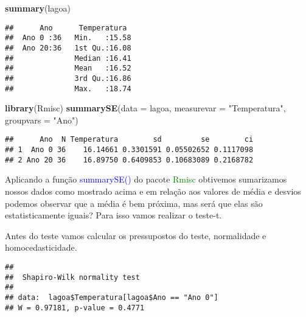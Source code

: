 \documentclass[14pt,titlepage, oneside, openany, a4paper]{book}
\newenvironment{Shaded}{\begin{snugshade}}{\end{snugshade}}
\newcommand{\DataTypeTok}[1]{\textcolor[rgb]{0.13,0.29,0.53}{#1}}
\newcommand{\KeywordTok}[1]{\textcolor[rgb]{0.13,0.29,0.53}{\textbf{#1}}}
\newcommand{\NormalTok}[1]{#1}
\newcommand{\OperatorTok}[1]{\textcolor[rgb]{0.81,0.36,0.00}{\textbf{#1}}}
\newcommand{\StringTok}[1]{\textcolor[rgb]{0.31,0.60,0.02}{#1}}
\begin{document}
\begin{Shaded}
\begin{Highlighting}[]
\KeywordTok{summary}\NormalTok{(lagoa)}
\end{Highlighting}
\end{Shaded}

\begin{verbatim}
##      Ano      Temperatura   
##  Ano 0 :36   Min.   :15.58  
##  Ano 20:36   1st Qu.:16.08  
##              Median :16.41  
##              Mean   :16.52  
##              3rd Qu.:16.86  
##              Max.   :18.74
\end{verbatim}

\begin{Shaded}
\begin{Highlighting}[]
\KeywordTok{library}\NormalTok{(Rmisc)}
\KeywordTok{summarySE}\NormalTok{(}\DataTypeTok{data =}\NormalTok{ lagoa, }\DataTypeTok{measurevar =} \StringTok{"Temperatura"}\NormalTok{, }\DataTypeTok{groupvars =} \StringTok{"Ano"}\NormalTok{)}
\end{Highlighting}
\end{Shaded}

\begin{verbatim}
##      Ano  N Temperatura        sd         se        ci
## 1  Ano 0 36    16.14661 0.3301591 0.05502652 0.1117098
## 2 Ano 20 36    16.89750 0.6409853 0.10683089 0.2168782
\end{verbatim}

Aplicando a função \textcolor{blue}{summarySE()} do pacote \textcolor{green}{Rmisc} obtivemos sumarizamos nossos dados como mostrado acima e em relação aos valores de média e desvios podemos observar que a média é bem próxima, mas será que elas são estatisticamente iguais? Para isso vamos realizar o teste-t.

Antes do teste vamos calcular os pressupostos do teste, normalidade e homocedasticidade.

\begin{Shaded}
\end{Shaded}

\begin{verbatim}
## 
##  Shapiro-Wilk normality test
## 
## data:  lagoa$Temperatura[lagoa$Ano == "Ano 0"]
## W = 0.97181, p-value = 0.4771
\end{verbatim}
\end{document}
